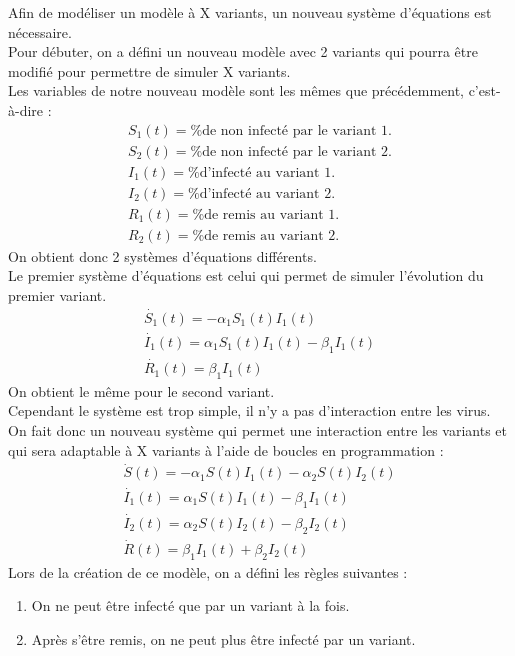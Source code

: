 \documentclass{article}
\begin{document}
Afin de modéliser un modèle à X variants, un nouveau système d'équations est nécessaire.\\
Pour débuter, on a défini un nouveau modèle avec 2 variants qui pourra être modifié pour permettre de simuler X variants.\\
\noindent
Les variables de notre nouveau modèle sont les mêmes que précédemment, c'est-à-dire :
\begin{align}
    S_1(t)= \text{\% de non infecté par le variant 1.} \\
    S_2(t)= \text{\% de non infecté par le variant 2.} \\
    I_1(t)= \text{\% d'infecté au variant 1.} \\
    I_2(t)= \text{\% d'infecté au variant 2.} \\
    R_1(t)= \text{\% de remis au variant 1.} \\
    R_2(t)= \text{\% de remis au variant 2.}
\end{align}
\noindent
On obtient donc 2 systèmes d'équations différents. \\
\noindent
Le premier système d'équations est celui qui permet de simuler l'évolution du premier variant.\\
\begin{align}
    \dot{S_1}(t)= -\alpha_1 S_1(t)I_1(t) \\
    \dot{I_1}(t)= \alpha_1 S_1(t)I_1(t)-\beta_1 I_1(t) \\
    \dot{R_1}(t)= \beta_1 I_1(t)
\end{align}
On obtient le même pour le second variant. \\
Cependant le système est trop simple, il n'y a pas d'interaction entre les virus. \\
On fait donc un nouveau système qui permet une interaction entre les variants et qui sera adaptable à X variants à l'aide de boucles en programmation :
\begin{align}
    \dot{S}(t)= -\alpha_1 S(t)I_1(t) - \alpha_2 S(t)I_2(t) \\
    \dot{I_1}(t)= \alpha_1 S(t)I_1(t)-\beta_1 I_1(t) \\
    \dot{I_2}(t)= \alpha_2 S(t)I_2(t)-\beta_2 I_2(t) \\
    \dot{R}(t)= \beta_1 I_1(t) + \beta_2 I_2(t)
\end{align}
\noindent
Lors de la création de ce modèle, on a défini les règles suivantes :
\begin{enumerate}
    \item On ne peut être infecté que par un variant à la fois.
    \item Après s'être remis, on ne peut plus être infecté par un variant.
\end{enumerate}
\end{document}
